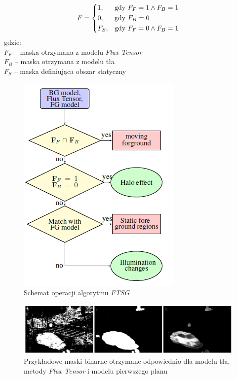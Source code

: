 \documentclass[10pt,a4paper]{article}
\begin{document}
\begin{equation}
    F= 
\begin{dcases}
    1,   & \text{gdy }  F_F = 1 \land F_B = 1\\
    0,   & \text{gdy }  F_B = 0\\ 
    F_S, & \text{gdy }  F_F = 0 \land F_B = 1\\
\end{dcases}
\label{equ:final_mask}
\end{equation}
gdzie:\\
	\-\hspace{1cm} $F_F$ -- maska otrzymana z modelu \textit{Flux Tensor}\\
	\-\hspace{1cm} $F_B$ -- maska otrzymana z modelu tła\\
	\-\hspace{1cm} $F_S$ -- maska definiująca obszar statyczny \\


		\begin{figure}[h]
				\centering
				\includegraphics[scale=0.8]{img/FTSG_flow.png}
				\caption{Schemat operacji algorytmu \textit{FTSG}}
				\label{fig:FTSG_flow}
		\end{figure}
		
		\begin{figure}[h]
				\centering
				\includegraphics[scale=0.65]{img/FTSG_models.png}
				\caption{Przykładowe maski binarne otrzymane odpowiednio dla modelu tła, metody \textit{Flux Tensor} i modelu pierwszego planu}
				\label{fig:ftsg_models}
		\end{figure}
\end{document}
